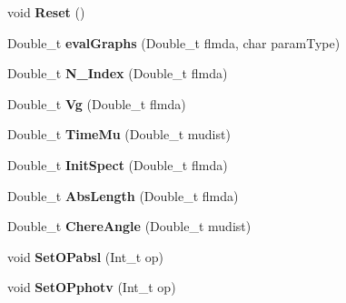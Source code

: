 \begin{DoxyCompactItemize}
\item 
\hypertarget{classWaterModel_ac8a4cfb002c6b3be2ffd7152ca5b3957}{
void {\bfseries Reset} ()}
\label{classWaterModel_ac8a4cfb002c6b3be2ffd7152ca5b3957}

\item 
\hypertarget{classWaterModel_a8a46f941b46a18a2c92b2bd51aa13cc6}{
Double\_\-t {\bfseries evalGraphs} (Double\_\-t flmda, char paramType)}
\label{classWaterModel_a8a46f941b46a18a2c92b2bd51aa13cc6}

\item 
\hypertarget{classWaterModel_a0f254d7e4ab49257491faea7762aa1fd}{
Double\_\-t {\bfseries N\_\-Index} (Double\_\-t flmda)}
\label{classWaterModel_a0f254d7e4ab49257491faea7762aa1fd}

\item 
\hypertarget{classWaterModel_aadea18f1b34dc39e49516adbdb16a8eb}{
Double\_\-t {\bfseries Vg} (Double\_\-t flmda)}
\label{classWaterModel_aadea18f1b34dc39e49516adbdb16a8eb}

\item 
\hypertarget{classWaterModel_af8281088a7db1797dcd88ef277824763}{
Double\_\-t {\bfseries TimeMu} (Double\_\-t mudist)}
\label{classWaterModel_af8281088a7db1797dcd88ef277824763}

\item 
\hypertarget{classWaterModel_a046ec6f98a503f2aea0ca4b6ee4bdd0d}{
Double\_\-t {\bfseries InitSpect} (Double\_\-t flmda)}
\label{classWaterModel_a046ec6f98a503f2aea0ca4b6ee4bdd0d}

\item 
\hypertarget{classWaterModel_a46943a79b03f5840475ab122d40da342}{
Double\_\-t {\bfseries AbsLength} (Double\_\-t flmda)}
\label{classWaterModel_a46943a79b03f5840475ab122d40da342}

\item 
\hypertarget{classWaterModel_a892483911e55b10dddabc9a13c441ed2}{
Double\_\-t {\bfseries ChereAngle} (Double\_\-t mudist)}
\label{classWaterModel_a892483911e55b10dddabc9a13c441ed2}

\item 
\hypertarget{classWaterModel_a03aba5ce7f51604d9b2971d482f7a5b3}{
void {\bfseries SetOPabsl} (Int\_\-t op)}
\label{classWaterModel_a03aba5ce7f51604d9b2971d482f7a5b3}

\item 
\hypertarget{classWaterModel_a426801e8922a7490795f15107a8eecb8}{
void {\bfseries SetOPphotv} (Int\_\-t op)}
\label{classWaterModel_a426801e8922a7490795f15107a8eecb8}


\end{DoxyCompactItemize}
